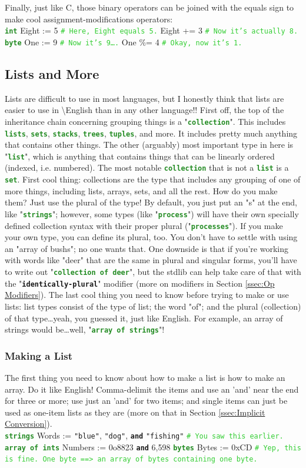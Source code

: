 \documentclass{article}
\newcommand{\name}{\textbackslash{}English}				%
\newcommand{\ssecl}[1]{\subsection{#1}\label{ssec:#1}}
\newcommand{\sssecl}[1]{\subsubsection{#1}\label{sssec:#1}}
\newcommand{\codecomment}[1]{\texttt{\textcolor{LimeGreen}{#1}}}
\newcommand{\commentline}[1]{\codecomment{\# #1}}
\newcommand{\type}[1]{\texttt{\textcolor{ForestGreen}{\textbf{#1}}}}
\newcommand{\common}[1]{\texttt{\textcolor{Mulberry}{\textbf{#1}}}}
\newcommand{\codestring}[1]{\texttt{\textcolor{NavyBlue}{"#1"}}}
\newenvironment{code}[0]
{\ttfamily{}				%
\setlength\parindent{0cm}	%
~\\}
{\setlength\parindent{1cm}
~\\}
\begin{document}
\indent Finally, just like C, those binary operators can be joined with the equals sign to make cool assignment-modifications operators:
\begin{code}
\type{int} Eight := 5	\commentline{Here, Eight equals 5.}
Eight += 3	\commentline{Now it's actually 8.}
\\
\type{byte} One := 9	\commentline{Now it's 9\ldots.}
One \%= 4	\commentline{Okay, now it's 1.}
\end{code}

\ssecl{Lists and More}
\indent Lists are difficult to use in most languages, but I honestly think that lists are easier to use in \name{} than in any other language!!
\indent First off, the top of the inheritance chain concerning grouping things is a "\type{collection}". This includes \type{lists}, \type{sets}, \type{stacks}, \type{trees}, \type{tuples}, and more. It includes pretty much anything that contains other things. The other (arguably) most important type in here is "\type{list}", which is anything that contains things that can be linearly ordered (indexed, i.e. numbered). The most notable \type{collection} that is not a \type{list} is a \type{set}.
\indent First cool thing: collections are the type that includes any grouping of one of more things, including lists, arrays, sets, and all the rest. How do you make them? Just use the plural of the type! By default, you just put an "s" at the end, like "\type{strings}"; however, some types (like "\type{process}") will have their own specially defined collection syntax with their proper plural ("\type{processes}"). If you make your own type, you can define its plural, too. You don't have to settle with using an "array of bushs"; no one wants that. One downside is that if you're working with words like "deer" that are the same in plural and singular forms, you'll have to write out "\type{collection of deer}", but the stdlib can help take care of that with the "\common{identically-plural}" modifier (more on modifiers in Section \ref{ssec:Op Modifiers}).
\indent The last cool thing you need to know before trying to make or use lists: list types consist of the type of list; the word "of"; and the plural (collection) of that type\ldots yeah, you guessed it, just like English. For example, an array of strings would be\ldots well, "\type{array of strings}"!

\sssecl{Making a List}
\indent The first thing you need to know about how to make a list is how to make an array. Do it like English! Comma-delimit the items and use an 'and' near the end for three or more; use just an 'and' for two items; and single items can just be used as one-item lists as they are (more on that in Section \ref{ssec:Implicit Conversion}).
\begin{code}
\type{strings} Words := \codestring{blue}, \codestring{dog}, \common{and} \codestring{fishing} \commentline{You saw this earlier.}
\type{array of ints} Numbers := 0o8823 \common{and} 6,598
\type{bytes} Bytes := 0xCD \commentline{Yep, this is fine. One byte ==> an array of bytes containing one byte.}
\end{code}
\end{document}
